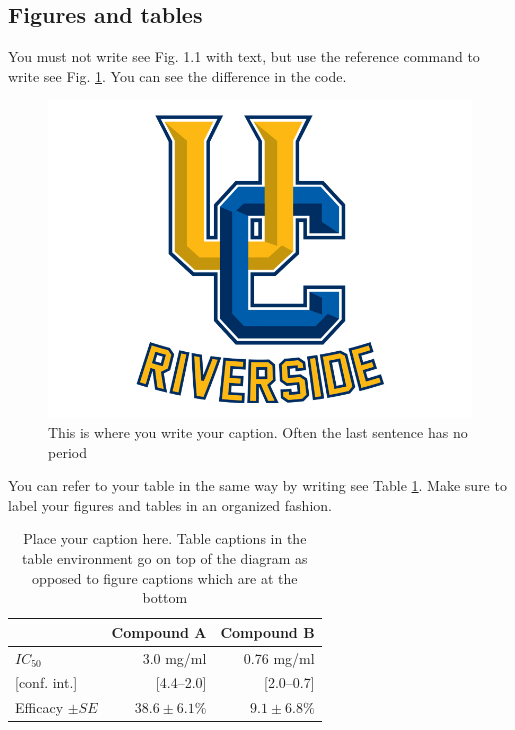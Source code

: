 \subsection{Figures and tables}

You must not write see Fig. 1.1 with text, but use the reference command to write see Fig. \ref{fig:1.1}. You can see the difference in the code.
\begin{figure}[H] %
\centering
\includegraphics[scale = 0.3] {images/ucr}
\caption{This is where you write your caption. Often the last sentence has no period} 
\label{fig:1.1}
\end{figure}


You can refer to your table in the same way by writing see Table \ref{table:1.1}. Make sure to label your figures and tables in an organized fashion.

\begin{table}[H] %
\centering
\caption{Place your caption here. Table captions in the table environment go on top of the diagram as opposed to figure captions which are at the bottom}
\label{table:1.1}
\begin{tabular}{@{}lrr@{}}
\toprule
 & Compound A & Compound B \\
 \midrule
$IC_{50}$ & 3.0 mg/ml & 0.76 mg/ml \\
{[conf. int.]} & [4.4–2.0] & [2.0–0.7] \\
Efficacy $\pm SE$ & $38.6 \pm 6.1\%$ & $9.1 \pm 6.8\%$ \\ 
\bottomrule
\end{tabular}
\end{table}


